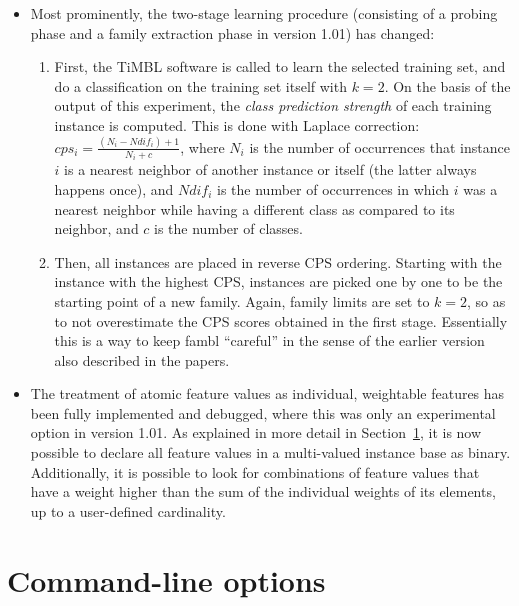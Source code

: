 \documentclass[11pt]{article}
\begin{document}
\begin{itemize}
\item
Most prominently, the two-stage learning procedure (consisting of a
probing phase and a family extraction phase in version 1.01) has changed:
        \begin{enumerate}
        \item
        First, the TiMBL software is called to learn the selected
        training set, and do a classification on the training
        set itself with $k=2$. On the basis of the output of this
        experiment, the {\em class prediction strength}\/ of each
        training instance is computed. This is
        done with Laplace correction: $cps_{i} = 
        \frac{(N_{i}-Ndif_{i})+1}{N_{i}+c}$, where $N_{i}$ is the
        number of occurrences that instance $i$ is a nearest neighbor
        of another instance or itself (the latter always happens once),
        and $Ndif_{i}$ is the number of occurrences in which $i$ was
        a nearest neighbor while having a different class as compared
        to its neighbor, and $c$ is the number of classes.
        \item
        Then, all instances are placed in reverse CPS ordering. Starting
        with the instance with the highest CPS, instances are picked
        one by one to be the starting point of a new family. Again,
        family limits are set to $k=2$, so as to not overestimate the
        CPS scores obtained in the first stage. Essentially this is a way
        to keep {\sc fambl} ``careful'' in the sense of the earlier
        version also described in the papers.
        \end{enumerate}
\item
The treatment of atomic feature values as individual, weightable
features has been fully implemented and debugged, where this was only
an experimental option in version 1.01. As explained in more detail in
Section~\ref{command}, it is now possible to declare all feature
values in a multi-valued instance base as binary. Additionally, it is
possible to look for combinations of feature values that have a weight
higher than the sum of the individual weights of its elements, up to a
user-defined cardinality.
\end{itemize}


\section{Command-line options}
\label{command}
\end{document}
